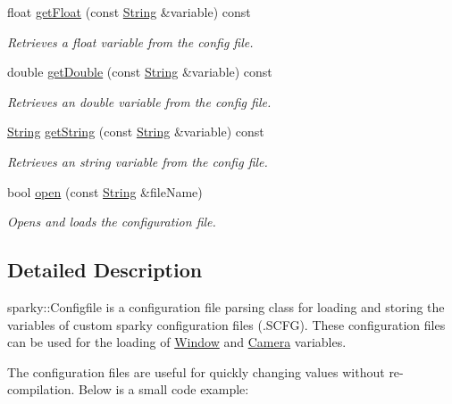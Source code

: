 \begin{DoxyCompactItemize}
float \hyperlink{classsparky_1_1_config_file_ad78fb1d454092583011889b07a71446a}{get\+Float} (const \hyperlink{classsparky_1_1_string}{String} \&variable) const 
\begin{DoxyCompactList}\small\item\em Retrieves a float variable from the config file. \end{DoxyCompactList}\item 
double \hyperlink{classsparky_1_1_config_file_a98547d5ed33002df4243a13394baf792}{get\+Double} (const \hyperlink{classsparky_1_1_string}{String} \&variable) const 
\begin{DoxyCompactList}\small\item\em Retrieves an double variable from the config file. \end{DoxyCompactList}\item 
\hyperlink{classsparky_1_1_string}{String} \hyperlink{classsparky_1_1_config_file_af5692457ccbc86c5a27bc3e648dd007f}{get\+String} (const \hyperlink{classsparky_1_1_string}{String} \&variable) const 
\begin{DoxyCompactList}\small\item\em Retrieves an string variable from the config file. \end{DoxyCompactList}\item 
bool \hyperlink{classsparky_1_1_config_file_a81085ec4e85214d68123aba52071b781}{open} (const \hyperlink{classsparky_1_1_string}{String} \&file\+Name)
\begin{DoxyCompactList}\small\item\em Opens and loads the configuration file. \end{DoxyCompactList}\end{DoxyCompactItemize}


\subsection{Detailed Description}
sparky\+::\+Configfile is a configuration file parsing class for loading and storing the variables of custom sparky configuration files (.S\+C\+FG). These configuration files can be used for the loading of \hyperlink{classsparky_1_1_window}{Window} and \hyperlink{classsparky_1_1_camera}{Camera} variables.

The configuration files are useful for quickly changing values without re-\/compilation. Below is a small code example\+:

